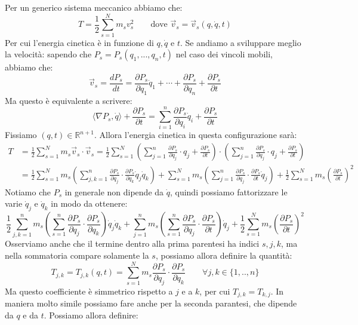 \documentclass[11pt,a4paper,twoside]{article}
\theoremstyle{definition}
\begin{document}
Per un generico sistema meccanico abbiamo che:
\[ T = \frac 12 \sum_{s=1}^N m_s v_s^2 \qquad \text{dove }\vec v_s = \vec v_s (q,\dot q, t)\]
Per cui l'energia cinetica è in funzione di $q, \dot q$ e $t$. Se andiamo a sviluppare meglio la velocità: sapendo che $P_s = P_s(q_1,...,q_n,t)$ nel caso dei vincoli mobili, abbiamo che:
\[ \vec v_s = \frac{dP_s}{dt} = \frac{\partial P_s}{\partial q_1} \dot q_1 + \cdots + \frac{\partial P_s}{\partial q_n} + \frac{\partial P_s}{\partial t}\]
Ma questo è equivalente a scrivere:
\[ \langle \nabla P_s, \dot q \rangle + \frac{\partial P_s}{\partial t} = \sum_{i = 1}^n \frac{\partial P_s}{\partial q_i}\dot q_i + \frac{\partial P_s}{\partial t} \]
Fissiamo $(q,t) \in \mathbb R^{n+1}$. Allora l'energia cinetica in questa configurazione sarà:
\begin{align*}
	T &= \frac 12 \sum_{s=1}^N m_s \vec v_s \cdot \vec v_s = \frac 12 \sum_{s=1}^N \left( \sum_{j=1}^n \frac{\partial P_s}{\partial q_j}\cdot q_j + \frac{\partial P_s}{\partial t} \right) \cdot \left( \sum_{j=1}^n \frac{\partial P_s}{\partial q_j}\cdot q_j + \frac{\partial P_s}{\partial t} \right)\\
	&= \frac 12 \sum_{s=1}^N m_s\left( \sum_{j,k=1}^n \frac{\partial P_s}{\partial q_j}\cdot \frac{\partial P_s}{\partial q_k} \dot q_j \dot q_k \right) + \sum_{s=1}^N m_s \left( \sum_{j=1}^n \frac{\partial P_s}{\partial q_j} \cdot \frac{\partial P_s}{\partial t} \dot q_j \right) + \frac 12 \sum_{s=1}^N m_s \left( \frac{\partial P_s}{\partial t} \right)^2
\end{align*}
Notiamo che $P_s$ in generale non dipende da $\dot q$, quindi possiamo fattorizzare le varie $\dot q_j$ e $\dot q_k$ in modo da ottenere:
\[ \frac 12 \sum_{j,k=1}^n m_s\left( \sum_{s=1}^n \frac{\partial P_s}{\partial q_j}\cdot \frac{\partial P_s}{\partial q_k}\right) \dot q_j \dot q_k + \sum_{j=1}^n m_s \left( \sum_{s=1}^n \frac{\partial P_s}{\partial q_j} \cdot \frac{\partial P_s}{\partial t} \right) \dot q_j + \frac 12 \sum_{s=1}^N m_s \left( \frac{\partial P_s}{\partial t} \right)^2 \]
Osserviamo anche che il termine dentro alla prima parentesi ha indici $s,j,k$, ma nella sommatoria compare solamente la $s$, possiamo allora definire la quantità:
\[ T_{j,k} = T_{j,k}(q,t) = \sum_{s=1}^N m_s \frac{\partial P_s}{\partial q_j}\cdot \frac{\partial P_s}{\partial q_k} \qquad \forall j,k \in \{1,..,n\} \]
Ma questo coefficiente è simmetrico rispetto a $j$ e a $k$, per cui $T_{j,k} = T_{k,j}$. In maniera molto simile possiamo fare anche per la seconda parantesi, che dipende da $q$ e da $t$. Possiamo allora definire:
\end{document}
